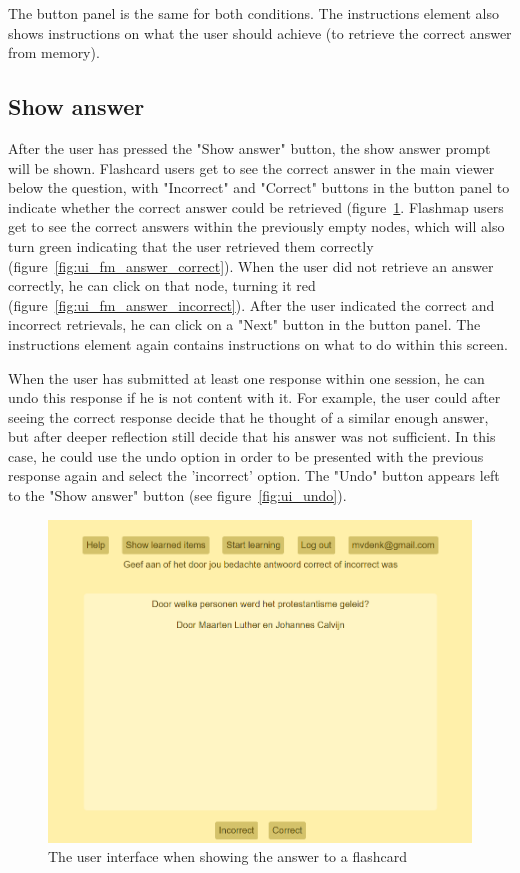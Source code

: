The button panel is the same for both conditions. The instructions element also shows instructions on what the user should achieve (to retrieve the correct answer from memory).

\subsection{Show answer}

After the user has pressed the "Show answer" button, the show answer prompt will be shown. Flashcard users get to see the correct answer in the main viewer below the question, with "Incorrect" and "Correct" buttons in the button panel to indicate whether the correct answer could be retrieved (figure~\ref{fig:ui_fc_answer}. Flashmap users get to see the correct answers within the previously empty nodes, which will also turn green indicating that the user retrieved them correctly (figure~\ref{fig:ui_fm_answer_correct}). When the user did not retrieve an answer correctly, he can click on that node, turning it red (figure~\ref{fig:ui_fm_answer_incorrect}). After the user indicated the correct and incorrect retrievals, he can click on a "Next" button in the button panel. The instructions element again contains instructions on what to do within this screen.

When the user has submitted at least one response within one session, he can undo this response if he is not content with it. For example, the user could after seeing the correct response decide that he thought of a similar enough answer, but after deeper reflection still decide that his answer was not sufficient. In this case, he could use the undo option in order to be presented with the previous response again and select the 'incorrect' option. The "Undo" button appears left to the "Show answer" button (see figure~\ref{fig:ui_undo}).

\begin{figure}
    \centering
    \includegraphics[width=.8\textwidth]{img/ui_fc_answer.png}
    \caption{The user interface when showing the answer to a flashcard}
    \label{fig:ui_fc_answer}
\end{figure}

